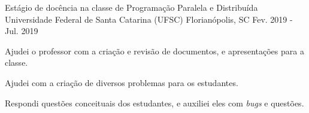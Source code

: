 

\begin{cventries}

  \cventry
    {Estágio de docência na classe de Programação Paralela e Distribuída} %
    {Universidade Federal de Santa Catarina (UFSC)} %
    {Florianópolis, SC} %
    {Fev. 2019 - Jul. 2019} %
    {
      \begin{cvitems} %
        \item {Ajudei o professor com a criação e revisão de documentos, e
          apresentações para a classe.}
        \item {Ajudei com a criação de diversos problemas para os estudantes.}
        \item {Respondi questões conceituais dos estudantes, e auxiliei eles com
          \textit{bugs} e questões.}
      \end{cvitems}
    }

\end{cventries}
